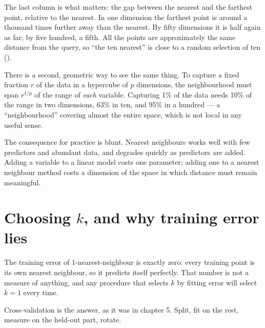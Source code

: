 \documentclass[
  letterpaper,
  10pt,
  twoside,
  openright,
  numbers=noenddot,
  chapterprefix=true]{scrbook}
\begin{document}
The last column is what matters: the gap between the nearest and the
farthest point, relative to the nearest. In one dimension the farthest
point is around a thousand times further away than the nearest. By fifty
dimensions it is half again as far; by five hundred, a fifth. All the
points are approximately the same distance from the query, so ``the ten
nearest'' is close to a random selection of ten
().

There is a second, geometric way to see the same thing. To capture a
fixed fraction \(r\) of the data in a hypercube of \(p\) dimensions, the
neighbourhood must span \(r^{1/p}\) of the range of \emph{each}
variable. Capturing 1\% of the data needs 10\% of the range in two
dimensions, 63\% in ten, and 95\% in a hundred --- a ``neighbourhood''
covering almost the entire space, which is not local in any useful
sense.

The consequence for practice is blunt. Nearest neighbours works well
with few predictors and abundant data, and degrades quickly as
predictors are added. Adding a variable to a linear model costs one
parameter; adding one to a nearest neighbour method costs a dimension of
the space in which distance must remain meaningful.

\section{\texorpdfstring{Choosing \(k\), and why training error
lies}{Choosing k, and why training error lies}}\label{choosing-k-and-why-training-error-lies}

The training error of \(1\)-nearest-neighbour is exactly zero: every
training point is its own nearest neighbour, so it predicts itself
perfectly. That number is not a measure of anything, and any procedure
that selects \(k\) by fitting error will select \(k = 1\) every time.

Cross-validation is the answer, as it was in chapter 5. Split, fit on
the rest, measure on the held-out part, rotate.
\end{document}
